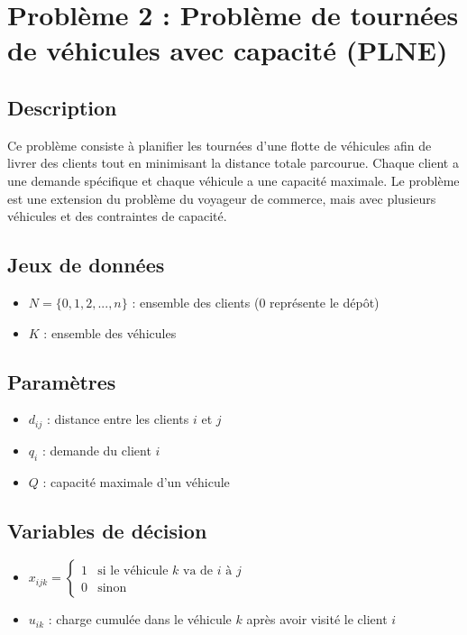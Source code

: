 \documentclass[a4paper,11pt]{article}
\begin{document}
\section{Problème 2 : Problème de tournées de véhicules avec capacité (PLNE)}

\subsection{Description}
Ce problème consiste à planifier les tournées d'une flotte de véhicules afin de livrer des clients tout en minimisant la distance totale parcourue. Chaque client a une demande spécifique et chaque véhicule a une capacité maximale. Le problème est une extension du problème du voyageur de commerce, mais avec plusieurs véhicules et des contraintes de capacité.

\subsection{Jeux de données}
\begin{itemize}
  \item $N = \{0, 1, 2, ..., n\}$ : ensemble des clients (0 représente le dépôt)
  \item $K$ : ensemble des véhicules
\end{itemize}

\subsection{Paramètres}
\begin{itemize}
  \item $d_{ij}$ : distance entre les clients $i$ et $j$
  \item $q_i$ : demande du client $i$
  \item $Q$ : capacité maximale d'un véhicule
\end{itemize}

\subsection{Variables de décision}
\begin{itemize}
  \item $x_{ijk} = 
    \begin{cases}
      1 & \text{si le véhicule $k$ va de $i$ à $j$} \\
      0 & \text{sinon}
    \end{cases}$
  \item $u_{ik}$ : charge cumulée dans le véhicule $k$ après avoir visité le client $i$
\end{itemize}
\end{document}
